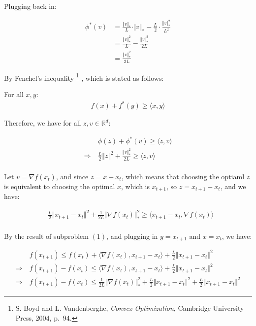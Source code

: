 \documentclass{article}
\begin{document}
Plugging back in:

\begin{align*}
    \phi^*(v) 
    &= \frac{\Vert v \Vert_*}{L} \cdot \Vert v \Vert_* - \frac{L}{2} \cdot \frac{\Vert v \Vert_*^2}{L^2} \\
    &= \frac{\Vert v \Vert_*^2}{L} - \frac{\Vert v \Vert_*^2}{2L} \\
    &= \frac{\Vert v \Vert_*^2}{2L}
\end{align*}


By Fenchel's inequality
\footnote{S. Boyd and L. Vandenberghe, \textit{Convex Optimization}, Cambridge University Press, 2004, p.~94.}
, which is stated as follows:

\begin{tcolorbox}[greenbox, title = Fenchel's inequality]
    For all $x, y$:
    \begin{align*}
        f(x) + f^*(y) \geq \langle x, y \rangle
    \end{align*}
\end{tcolorbox}

Therefore, we have for all $z, v \in \mathbb{R}^d$:

\begin{align*}
    &\phi(z) + \phi^*(v) \geq \langle z, v \rangle \\
    \Rightarrow \ &\frac{L}{2} \Vert z \Vert^2 + \frac{\Vert v \Vert_*^2}{2L} \geq \langle z, v \rangle \\
\end{align*}

Let $v = \nabla f(x_t)$, and since $z = x - x_t$, which means that choosing the optiaml $z$ is equivalent to choosing the optimal $x$, which is $x_{t+1}$,
so $z = x_{t+1} - x_t$, and we have:

\begin{align*}
    &\frac{L}{2} \Vert x_{t+1} - x_t \Vert^2 + \frac{1}{2L} \Vert \nabla f(x_t) \Vert_*^2 \geq \langle x_{t+1} - x_t, \nabla f(x_t) \rangle \\
\end{align*}

By the result of subproblem $(1)$, and plugging in $y = x_{t + 1}$ and $x = x_t$, we have:

\begin{align*}
    &f ( x_{t + 1} ) \leq f ( x_t ) + \langle \nabla f(x_t), x_{t+1} - x_t \rangle + \frac{L}{2} \Vert x_{t+1} - x_t \Vert^2 \\
    \Rightarrow \ &f ( x_{t + 1} ) - f ( x_t ) \leq \langle \nabla f(x_t), x_{t+1} - x_t \rangle + \frac{L}{2} \Vert x_{t+1} - x_t \Vert^2 \\
    \Rightarrow \ &f ( x_{t + 1} ) - f ( x_t ) \leq \frac{1}{2L} \Vert \nabla f(x_t) \Vert_*^2 + \frac{L}{2} \Vert x_{t+1} - x_t \Vert^2 + \frac{L}{2} \Vert x_{t+1} - x_t \Vert^2 
\end{align*}
\end{document}
